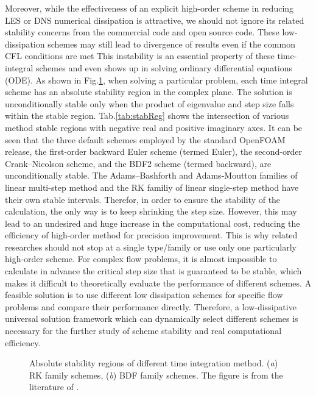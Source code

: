 \documentclass{article}
\begin{document}
Moreover, while the effectiveness of an explicit high-order scheme in reducing LES or DNS numerical dissipation is attractive, we should not ignore its related stability concerns from the commercial code and open source code. These low-dissipation schemes may still lead to divergence of results even if the common CFL conditions are met \citep{Canuto:2007} This instability is an essential property of these time-integral schemes and even shows up in solving ordinary differential equations (ODE). As shown in Fig.\ref{fig:stabReg}, when solving a particular problem, each time integral scheme has an absolute stability region in the complex plane. The solution is unconditionally stable only when the product of eigenvalue and step size falls within the stable region. Tab.\ref{tab:stabReg} shows the intersection of various method stable regions with negative real and positive imaginary axes. It can be seen that the three default schemes employed by the standard OpenFOAM release, the first-order backward Euler scheme (termed Euler), the second-order Crank--Nicolson scheme, and the BDF2 scheme (termed backward), are unconditionally stable. The Adams--Bashforth and Adams-Moutton families of linear multi-step method and the RK familiy of linear single-step method have their own stable intervals. Therefor, in order to ensure the stability of the calculation, the only way is to keep shrinking the step size. However, this may lead to an undesired and huge increase in the computational cost, reducing the efficiency of high-order method for precision improvement. This is why related researches should not stop at a single type/family or use only one particularly high-order scheme. For complex flow problems, it is almost impossible to calculate in advance the critical step size that is guaranteed to be stable, which makes it difficult to theoretically evaluate the performance of different schemes. A feasible solution is to use different low dissipation schemes for specific flow problems and compare their performance directly. Therefore, a low-dissipative universal solution framework which can dynamically select different schemes is necessary for the further study of scheme stability and real computational efficiency.

\begin{figure}
	\centering
	\caption{Absolute stability regions of different time integration method. (\textit{a}) RK family schemes, (\textit{b}) BDF family schemes. The figure is from the literature of \citet{Canuto:2007}.}
	\label{fig:stabReg}
\end{figure}
\end{document}
